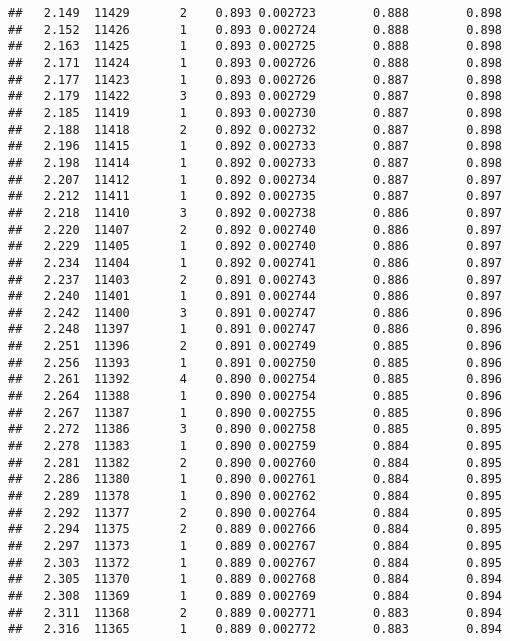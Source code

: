 \documentclass[
]{book}
\begin{document}
\begin{verbatim}
##   2.149  11429       2    0.893 0.002723        0.888        0.898
##   2.152  11426       1    0.893 0.002724        0.888        0.898
##   2.163  11425       1    0.893 0.002725        0.888        0.898
##   2.171  11424       1    0.893 0.002726        0.888        0.898
##   2.177  11423       1    0.893 0.002726        0.887        0.898
##   2.179  11422       3    0.893 0.002729        0.887        0.898
##   2.185  11419       1    0.893 0.002730        0.887        0.898
##   2.188  11418       2    0.892 0.002732        0.887        0.898
##   2.196  11415       1    0.892 0.002733        0.887        0.898
##   2.198  11414       1    0.892 0.002733        0.887        0.898
##   2.207  11412       1    0.892 0.002734        0.887        0.897
##   2.212  11411       1    0.892 0.002735        0.887        0.897
##   2.218  11410       3    0.892 0.002738        0.886        0.897
##   2.220  11407       2    0.892 0.002740        0.886        0.897
##   2.229  11405       1    0.892 0.002740        0.886        0.897
##   2.234  11404       1    0.892 0.002741        0.886        0.897
##   2.237  11403       2    0.891 0.002743        0.886        0.897
##   2.240  11401       1    0.891 0.002744        0.886        0.897
##   2.242  11400       3    0.891 0.002747        0.886        0.896
##   2.248  11397       1    0.891 0.002747        0.886        0.896
##   2.251  11396       2    0.891 0.002749        0.885        0.896
##   2.256  11393       1    0.891 0.002750        0.885        0.896
##   2.261  11392       4    0.890 0.002754        0.885        0.896
##   2.264  11388       1    0.890 0.002754        0.885        0.896
##   2.267  11387       1    0.890 0.002755        0.885        0.896
##   2.272  11386       3    0.890 0.002758        0.885        0.895
##   2.278  11383       1    0.890 0.002759        0.884        0.895
##   2.281  11382       2    0.890 0.002760        0.884        0.895
##   2.286  11380       1    0.890 0.002761        0.884        0.895
##   2.289  11378       1    0.890 0.002762        0.884        0.895
##   2.292  11377       2    0.890 0.002764        0.884        0.895
##   2.294  11375       2    0.889 0.002766        0.884        0.895
##   2.297  11373       1    0.889 0.002767        0.884        0.895
##   2.303  11372       1    0.889 0.002767        0.884        0.895
##   2.305  11370       1    0.889 0.002768        0.884        0.894
##   2.308  11369       1    0.889 0.002769        0.884        0.894
##   2.311  11368       2    0.889 0.002771        0.883        0.894
##   2.316  11365       1    0.889 0.002772        0.883        0.894

\end{verbatim}
\end{document}
